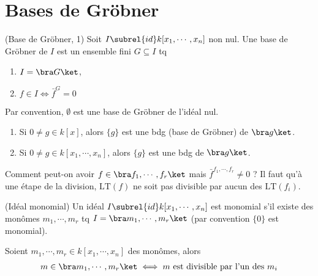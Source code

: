     \section{Bases de Gröbner}
        \begin{defi} (Base de Gröbner, 1)
            \label{grob_1}
            Soit $I \subrel{id} k[x_1, \cdots, x_n]$ non nul. Une base de Gröbner de $I$ est un ensemble fini $G \subseteq I$ tq
            \begin{enumerate}
                \item $I = \bra G \ket$,
                \item $f \in I \iff \bar f^G = 0$
            \end{enumerate}
        \end{defi}
        Par convention, $\emptyset$ est une base de Gröbner de l'idéal nul.
        \begin{expl}
            \begin{enumerate}
                \item Si $0 \neq g \in k[x]$, alors $\{g\}$ est une bdg (base de Gröbner) de $\bra g \ket$.
                \item Si $0 \neq g \in k[x_1, \cdots, x_n]$, alors $\{g\}$ est une bdg de $\bra g \ket$.
            \end{enumerate}
        \end{expl}
        Comment peut-on avoir $f \in \bra f_1, \cdots, f_r \ket$ mais $\bar f^{f_1, \cdots, f_r} \neq 0$ ? Il faut qu'à une étape de la division, $\mathrm{LT}(f)$ ne soit pas divisible par aucun des $\mathrm{LT}(f_i)$. 
        \begin{defi} (Idéal monomial)
            Un idéal $I \subrel{id} k[x_1, \cdots, x_n]$ est monomial s'il existe des monômes $m_1, \cdots, m_r$ tq $I = \bra m_1, \cdots, m_r \ket$ (par convention $\{0\}$ est monomial).
        \end{defi}
        \begin{prop}
            \label{prop131}
            Soient $m_1, \cdots, m_r \in k[x_1, \cdots, x_n]$ des monômes, alors 
            \begin{align*}
                m \in \bra m_1, \cdots, m_r \ket \iff m \text{ est divisible par l'un des } m_i
            \end{align*}
        \end{prop}
